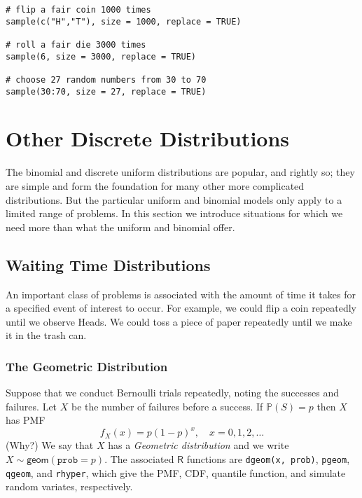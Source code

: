 \begin{Verbatim}
# flip a fair coin 1000 times
sample(c("H","T"), size = 1000, replace = TRUE)

# roll a fair die 3000 times
sample(6, size = 3000, replace = TRUE)

# choose 27 random numbers from 30 to 70
sample(30:70, size = 27, replace = TRUE)
\end{Verbatim}

\section{Other Discrete Distributions}
\label{sec-5-6}

The binomial and discrete uniform distributions are popular, and
rightly so; they are simple and form the foundation for many other
more complicated distributions. But the particular uniform and
binomial models only apply to a limited range of problems. In this
section we introduce situations for which we need more than what the
uniform and binomial offer.

\subsection{Waiting Time Distributions}
\label{sec-5-6-2}

An important class of problems is associated with the amount of
time it takes for a specified event of interest to occur. For example,
we could flip a coin repeatedly until we observe Heads. We could toss
a piece of paper repeatedly until we make it in the trash can.

\subsubsection{The Geometric Distribution}
\label{sec-5-6-2-1}

Suppose that we conduct Bernoulli trials repeatedly, noting the
successes and failures. Let \(X\) be the number of failures before a
success. If \(\mathbb{P}(S)=p\) then \(X\) has PMF
\begin{equation}
f_{X}(x)=p(1-p)^{x},\quad x=0,1,2,\ldots
\end{equation}
(Why?) We say that \(X\) has a \emph{Geometric distribution} and we write
\(X\sim\mathsf{geom}(\mathtt{prob}=p)\). The associated \(\mathsf{R}\)
functions are \texttt{dgeom(x, prob)}, \texttt{pgeom}, \texttt{qgeom}, and \texttt{rhyper}, which
give the PMF, CDF, quantile function, and simulate random variates,
respectively.

